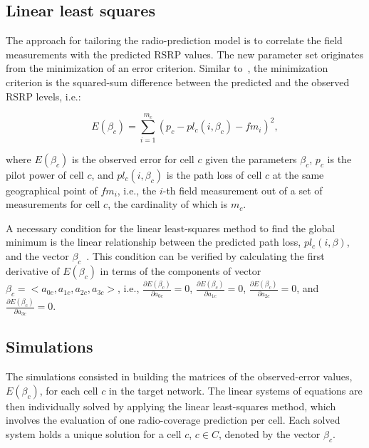 \subsection{Linear least squares \label{sub:05-Linear_least_squares}}

The approach for tailoring the radio-prediction model is to correlate
the field measurements with the predicted RSRP values. The new parameter
set originates from the minimization of an error criterion. Similar
to~\cite{Aarnaes-Tuning_of_empirical_radio_propagation_models_effect_of_location_accuracy:2004,Huang_Online_propagation_model_correction_based_on_PSO_algorithm_in_LTE_SON_system:2012,Yang_A_linear_least_square_method_of_propagation_model_tuning_for_3G_radion_network_planning:2008},
the minimization criterion is the squared-sum difference between the
predicted and the observed RSRP levels, i.e.:

\begin{equation}
E(\beta_{c})=\sum_{i=1}^{m_{c}}(p_{c}-pl_{c}(i,\beta_{c})-fm_{i})^{2},\label{eq:05-Least_squares_error}
\end{equation}


\noindent where $E(\beta_{c})$ is the observed error for cell $c$
given the parameters $\beta_{c}$, $p_{c}$ is the pilot power of
cell $c$, and $pl_{c}(i,\beta_{c})$ is the path loss of cell $c$
at the same geographical point of $fm_{i}$, i.e., the $i$-th field
measurement out of a set of measurements for cell $c$, the cardinality
of which is $m_{c}$.

A necessary condition for the linear least-squares method to find
the global minimum is the linear relationship between the predicted
path loss, $pl_{c}(i,\beta)$, and the vector $\beta_{c}$~\cite{Yang_A_linear_least_square_method_of_propagation_model_tuning_for_3G_radion_network_planning:2008}.
This condition can be verified by calculating the first derivative
of $E(\beta_{c})$ in terms of the components of vector $\beta_{c}=<a_{0c},a_{1c},a_{2c},a_{3c}>$,
i.e., $\frac{\partial E(\beta_{c})}{\partial a_{0c}}=0$, $\frac{\partial E(\beta_{c})}{\partial a_{1c}}=0$,
$\frac{\partial E(\beta_{c})}{\partial a_{2c}}=0$, and $\frac{\partial E(\beta_{c})}{\partial a_{3c}}=0$.


\subsection{Simulations \label{sub:05-Simulations}}

The simulations consisted in building the matrices of the observed-error
values, $E(\beta_{c})$, for each cell $c$ in the target network.
The linear systems of equations are then individually solved by applying
the linear least-squares method, which involves the evaluation of
one radio-coverage prediction per cell. Each solved system holds a
unique solution for a cell $c$, $c\in C$, denoted by the vector
$\beta_{c}$.


